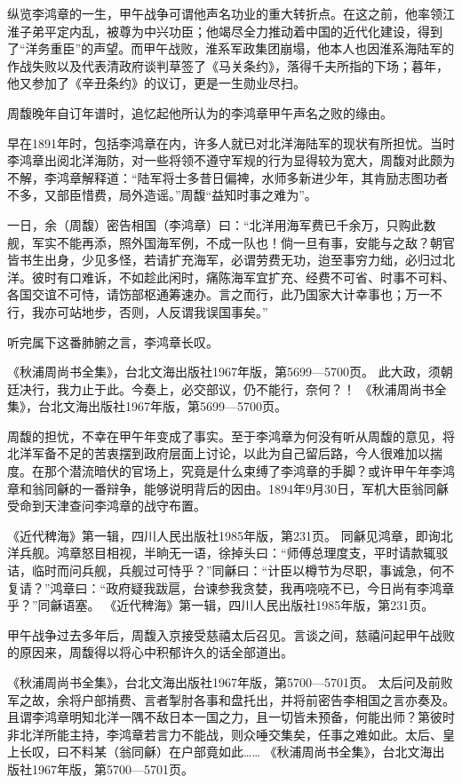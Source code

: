 \documentclass[12pt,UTF8]{ctexbook}
\begin{document}
纵览李鸿章的一生，甲午战争可谓他声名功业的重大转折点。在这之前，他率领江淮子弟平定内乱，被尊为中兴功臣；他竭尽全力推动着中国的近代化建设，得到了“洋务重臣”的声望。而甲午战败，淮系军政集团崩塌，他本人也因淮系海陆军的作战失败以及代表清政府谈判草签了《马关条约》，落得千夫所指的下场；暮年，他又参加了《辛丑条约》的议订，更是一生勋业尽扫。

周馥晚年自订年谱时，追忆起他所认为的李鸿章甲午声名之败的缘由。

早在1891年时，包括李鸿章在内，许多人就已对北洋海陆军的现状有所担忧。当时李鸿章出阅北洋海防，对一些将领不遵守军规的行为显得较为宽大，周馥对此颇为不解，李鸿章解释道：“陆军将士多昔日偏裨，水师多新进少年，其肯励志图功者不多，又部臣惜费，局外造谣。”周馥“益知时事之难为”。

一日，余（周馥）密告相国（李鸿章）曰：“北洋用海军费已千余万，只购此数舰，军实不能再添，照外国海军例，不成一队也！倘一旦有事，安能与之敌？朝官皆书生出身，少见多怪，若请扩充海军，必谓劳费无功，迨至事穷力绌，必归过北洋。彼时有口难诉，不如趁此闲时，痛陈海军宜扩充、经费不可省、时事不可料、各国交谊不可恃，请饬部枢通筹速办。言之而行，此乃国家大计幸事也；万一不行，我亦可站地步，否则，人反谓我误国事矣。”

听完属下这番肺腑之言，李鸿章长叹。

《秋浦周尚书全集》，台北文海出版社1967年版，第5699—5700页。
此大政，须朝廷决行，我力止于此。今奏上，必交部议，仍不能行，奈何？！ 《秋浦周尚书全集》，台北文海出版社1967年版，第5699—5700页。

周馥的担忧，不幸在甲午年变成了事实。至于李鸿章为何没有听从周馥的意见，将北洋军备不足的苦衷摆到政府层面上讨论，以此为自己留后路，今人很难加以揣度。在那个潜流暗伏的官场上，究竟是什么束缚了李鸿章的手脚？或许甲午年李鸿章和翁同龢的一番辩争，能够说明背后的因由。1894年9月30日，军机大臣翁同龢受命到天津查问李鸿章的战守布置。

《近代稗海》第一辑，四川人民出版社1985年版，第231页。
同龢见鸿章，即询北洋兵舰。鸿章怒目相视，半晌无一语，徐掉头曰：“师傅总理度支，平时请款辄驳诘，临时而问兵舰，兵舰过可恃乎？”同龢曰：“计臣以樽节为尽职，事诚急，何不复请？”鸿章曰：“政府疑我跋扈，台谏参我贪婪，我再哓哓不已，今日尚有李鸿章乎？”同龢语塞。 《近代稗海》第一辑，四川人民出版社1985年版，第231页。

甲午战争过去多年后，周馥入京接受慈禧太后召见。言谈之间，慈禧问起甲午战败的原因来，周馥得以将心中积郁许久的话全部道出。

《秋浦周尚书全集》，台北文海出版社1967年版，第5700—5701页。
太后问及前败军之故，余将户部掯费、言者掣肘各事和盘托出，并将前密告李相国之言亦奏及。且谓李鸿章明知北洋一隅不敌日本一国之力，且一切皆未预备，何能出师？第彼时非北洋所能主持，李鸿章若言力不能战，则众唾交集矣，任事之难如此。太后、皇上长叹，曰不料某（翁同龢）在户部竟如此…… 《秋浦周尚书全集》，台北文海出版社1967年版，第5700—5701页。
\end{document}
